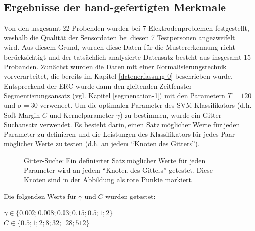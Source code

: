 \subsection{Ergebnisse der hand-gefertigten Merkmale} \label{ergebnisse-hc-features-subsec}

Von den insgesamt 22 Probenden wurden bei 7 Elektrodenproblemen festgestellt, weshalb die Qualität der Sensordaten bei diesen 7 Testpersonen angezweifelt wird.
Aus diesem Grund, wurden diese Daten für die Mustererkennung nicht berücksichtigt und der tatsächlich analysierte Datensatz besteht aus insgesamt 15 Probanden.
Zun{\"a}chst wurden die Daten mit einer Normalisierungstechnik vorverarbeitet, die bereits im Kapitel \ref{datenerfassung-0} beschrieben wurde.
Entsprechend der ERC wurde dann den gleitenden Zeitfenster-Segmentierungsansatz (vgl. Kapitel \ref{segmenation-1}) mit den Parametern $T=120$ und $\sigma=30$ verwendet.
Um die optimalen Parameter des SVM-Klassifikators (d.h. Soft-Margin $C$ und Kernelparameter $\gamma$) zu bestimmen, wurde ein Gitter-Suchansatz verwendet.
Es besteht darin, einen Satz m{\"o}glicher Werte f{\"u}r jeden Parameter zu definieren und die Leistungen des Klassifikators f{\"u}r jedes Paar m{\"o}glicher Werte zu testen (d.h. an jedem ``Knoten des Gitters''). \\

\begin{figure}[h]
\vspace{0.2cm} \caption[Gitter-Suche]{ Gitter-Suche: Ein definierter Satz m{\"o}glicher Werte f{\"u}r jeden Parameter wird an jedem ``Knoten des Gitters'' getestet. Diese Knoten sind in der Abbildung als rote Punkte markiert. }
\end{figure} 
\vspace{0.5cm}

Die folgenden Werte f{\"u}r $\gamma$ und $C$ wurden getestet:
\begin{center}
${\displaystyle \gamma \in \{0.002; 0.008; 0.03; 0.15; 0.5; 1; 2\}}$ \\
${\displaystyle C \in \{ 0.5; 1; 2; 8; 32; 128; 512 \}}$ \\
\end{center}
\vspace{0.5cm}

